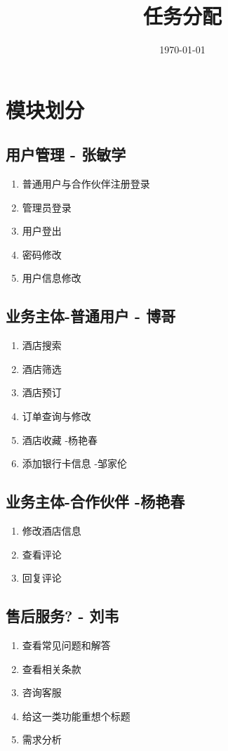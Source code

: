 \documentclass[18pt]{article}
\begin{document}
\tableofcontents
\title{任务分配}
\date{\today}
\maketitle

\section{模块划分}

	\subsection{用户管理 - 张敏学}
	\begin{enumerate}
		\item 普通用户与合作伙伴注册登录
		\item 管理员登录
		\item 用户登出
		\item 密码修改
		\item 用户信息修改
	\end{enumerate}
	
	\subsection{业务主体-普通用户 - 博哥}
	\begin{enumerate}
		\item 酒店搜索
		\item 酒店筛选
		\item 酒店预订
		\item 订单查询与修改
		\item 酒店收藏 -杨艳春
		\item 添加银行卡信息 -邹家伦
	\end{enumerate}
	
	\subsection{业务主体-合作伙伴 -杨艳春}
	\begin{enumerate}
		\item 修改酒店信息
		\item 查看评论
		\item 回复评论
	\end{enumerate}
	
	\subsection{售后服务? - 刘韦}
	\begin{enumerate}
		\item 查看常见问题和解答
		\item 查看相关条款
		\item 咨询客服
		\item 给这一类功能重想个标题
		\item 需求分析
	\end{enumerate}
	
\end{document}
